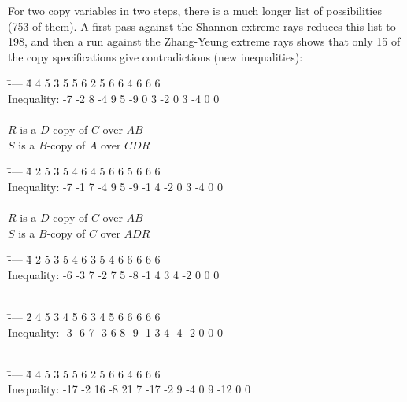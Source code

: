 \documentclass[10pt,journal]{IEEEtran}
\begin{document}
For two copy variables in two steps, there is a much longer list of possibilities
(753 of them).  A first pass against the Shannon extreme rays reduces this list
to 198, and then a run against the Zhang-Yeung extreme rays shows that only
15 of the copy specifications give contradictions (new inequalities):

\begin{tabbing}
 \quad \=---- \=4  4  5  3  5  5  6  2  5  6  6  4  6  6  6 \\
 \> \>Inequality: -7  -2   8  -4   9   5  -9   0   3  -2   0   3  -4   0   0\\
 \>      \\
 \>\> $R$ is a $D$-copy of $C$ over $AB$\\
  \>\>$S$ is a $B$-copy of $A$ over $CDR$\\
\end{tabbing}
\begin{tabbing}
 \quad \=---- \=4 2 5 3 5 4 6 4 5 6 6 5 6 6 6 \\
 \> \>Inequality: -7  -1  7  -4   9   5  -9   -1   4  -2   0   3  -4   0   0\\
 \>      \\
 \>\> $R$ is a $D$-copy of $C$ over $AB$\\
  \>\>$S$ is a $B$-copy of $C$ over $ADR$\\
\end{tabbing}
\begin{tabbing}
 \quad \=---- \=4 2 5 3 5 4 6 3 5 4 6 6 6 6 6 \\
 \> \>Inequality: -6  -3   7  -2   7   5  -8   -1   4  3  4   -2  0   0   0\\
 \>      \\
\end{tabbing}
\begin{tabbing}
 \quad \=---- \=2 4 5 3 4 5 6 3 4 5 6 6 6 6 6 \\
 \> \>Inequality: -3 -6 7 -3 6 8 -9 -1 3 4 -4 -2 0 0 0\\
 \>      \\
\end{tabbing}
\begin{tabbing}
 \quad \=---- \=4 4 5 3 5 5 6 2 5 6 6 4 6 6 6  \\
 \> \>Inequality: -17 -2 16 -8 21 7 -17 -2 9 -4 0 9 -12 0 0 \\
 \>      \\
\end{tabbing}
\end{document}
